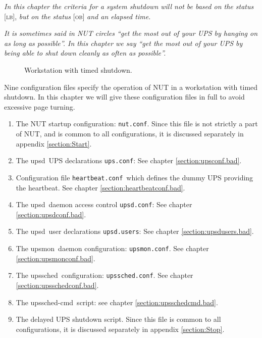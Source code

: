 \documentclass[12pt]{article}
\newcommand{\upsd}{\mbox{\textcolor{UPSDCOLOUR}{upsd}}}
\newcommand{\upsmon}{\mbox{\textcolor{MONCOLOUR}{upsmon}}}
\newcommand{\upssched}{\mbox{\textcolor{SCHEDCOLOUR}{upssched}}}
\newcommand{\upsschedcmd}{\mbox{\textcolor{CMDCOLOUR}{upssched-cmd}}}
\newcommand{\LB}{\textcolor{UPSDCOLOUR}{\textsc{lb}}}
\newcommand{\OB}{\textcolor{UPSDCOLOUR}{\textsc{ob}}}
\newcommand{\status}[1]{\textcolor{UPSDCOLOUR}{[{#1}]}}
\newcommand{\nutconf}{\textcolor{NUTCOLOUR}{\texttt{nut.conf}}}
\newcommand{\upsconf}{\textcolor{UPSDCOLOUR}{\texttt{ups.conf}}}
\newcommand{\heartbeatconf}{\textcolor{UPSDCOLOUR}{\texttt{heartbeat.conf}}}
\newcommand{\upsdconf}{\textcolor{UPSDCOLOUR}{\texttt{upsd.conf}}}
\newcommand{\upsdusers}{\textcolor{UPSDCOLOUR}{\texttt{upsd.users}}}
\newcommand{\upsmonconf}{\textcolor{MONCOLOUR}{\texttt{upsmon.conf}}}
\newcommand{\upsschedconf}{\textcolor{SCHEDCOLOUR}{\texttt{upssched.conf}}}
\newcommand{\ol}{\begin{enumerate}%
   \setlength{\itemsep}{0em}}
\newcommand{\eol}{\end{enumerate}}
\newcommand{\li}{\item}                 %
\newcommand{\refpage}[1]{\ref{#1}}
\begin{document}
\textsl{In this chapter the criteria for a system shutdown will not be
  based on the status} \status{\LB}, \textsl{but on the status}
\status{\OB} \textsl{and an elapsed time.}

\textsl{It is sometimes said in NUT circles ``get the most out of your UPS by
  hanging on as long as possible''.  In this chapter we say ``get the most out
  of your UPS by being able to shut down cleanly as often as possible''.}

\begin{figure}[ht]
\begin{center}
\end{center}
\vspace{-6mm}
\caption{Workstation with timed shutdown.\label{fig:bad}}
\end{figure}

Nine configuration files specify the operation of NUT in a workstation with
timed shutdown.  In this chapter we will give these configuration files in
full to avoid excessive page turning.

\ol

\li The NUT startup configuration: \nutconf.  Since this file is not strictly
a part of NUT, and is common to all configurations, it is discussed separately
in appendix \refpage{section:Start}.

\li The \upsd\ UPS declarations \upsconf: See chapter \ref{section:upsconf.bad}.

\li Configuration file \heartbeatconf\ which defines the dummy UPS providing
the heartbeat.  See chapter \ref{section:heartbeatconf.bad}.

\li The \upsd\ daemon access control \upsdconf: See chapter
\ref{section:upsdconf.bad}.

\li The \upsd\ user declarations \upsdusers: See chapter
\ref{section:upsdusers.bad}.

\li The \upsmon\ daemon configuration: \upsmonconf.  See chapter
\ref{section:upsmonconf.bad}.

\li The \upssched\ configuration: \upsschedconf.  See chapter
\ref{section:upsschedconf.bad}.

\li The \upsschedcmd\ script: see chapter \ref{section:upsschedcmd.bad}.

\li The delayed UPS shutdown script.  Since this file is common to all
configurations, it is discussed separately in appendix \refpage{section:Stop}.

\eol
\end{document}

